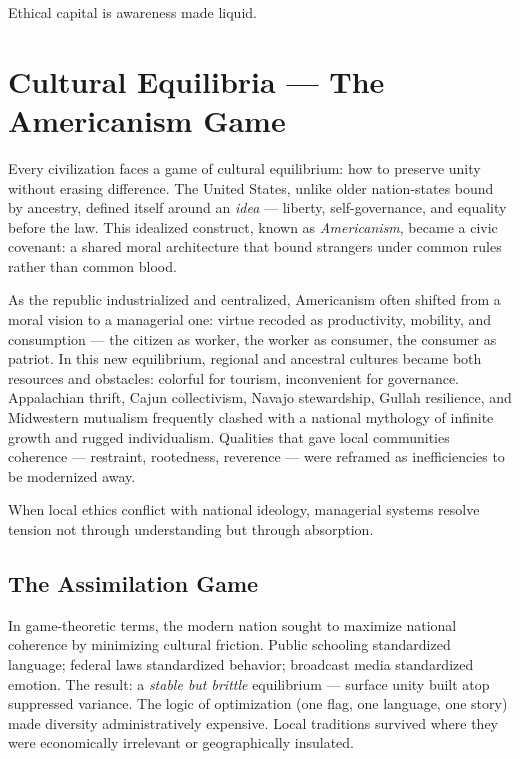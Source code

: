 \documentclass[12pt,twoside]{book}
\begin{document}
\begin{keyidea}
Ethical capital is awareness made liquid.
\end{keyidea}
\chapter{Cultural Equilibria — The Americanism Game}

Every civilization faces a game of cultural equilibrium: how to preserve unity without erasing difference.  
The United States, unlike older nation-states bound by ancestry, defined itself around an \emph{idea} — liberty, self-governance, and equality before the law.  
This idealized construct, known as \emph{Americanism}, became a civic covenant: a shared moral architecture that bound strangers under common rules rather than common blood.

As the republic industrialized and centralized, Americanism often shifted from a moral vision to a managerial one: virtue recoded as productivity, mobility, and consumption — the citizen as worker, the worker as consumer, the consumer as patriot.  
In this new equilibrium, regional and ancestral cultures became both resources and obstacles: colorful for tourism, inconvenient for governance.  
Appalachian thrift, Cajun collectivism, Navajo stewardship, Gullah resilience, and Midwestern mutualism frequently clashed with a national mythology of infinite growth and rugged individualism.  
Qualities that gave local communities coherence — restraint, rootedness, reverence — were reframed as inefficiencies to be modernized away. \\

\begin{keyidea}
When local ethics conflict with national ideology, managerial systems resolve tension not through understanding but through absorption.
\end{keyidea}

\section{The Assimilation Game}

In game-theoretic terms, the modern nation sought to maximize national coherence by minimizing cultural friction.  
Public schooling standardized language; federal laws standardized behavior; broadcast media standardized emotion.  
The result: a \emph{stable but brittle} equilibrium — surface unity built atop suppressed variance.  
The logic of optimization (one flag, one language, one story) made diversity administratively expensive.  
Local traditions survived where they were economically irrelevant or geographically insulated.
\end{document}
